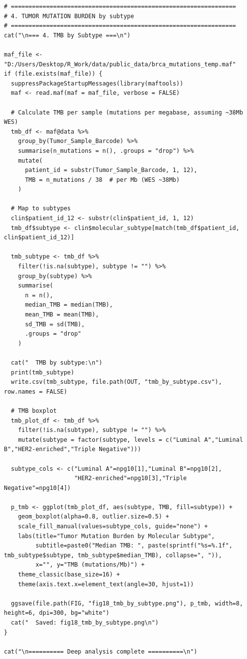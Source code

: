 \documentclass[12pt,a4paper]{ctexart}
\begin{document}
\begin{lstlisting}[caption={20_deep_analysis}, basicstyle=\ttfamily\scriptsize]
# ================================================================
# 4. TUMOR MUTATION BURDEN by subtype
# ================================================================
cat("\n=== 4. TMB by Subtype ===\n")

maf_file <- "D:/Users/Desktop/R_Work/data/public_data/brca_mutations_temp.maf"
if (file.exists(maf_file)) {
  suppressPackageStartupMessages(library(maftools))
  maf <- read.maf(maf = maf_file, verbose = FALSE)

  # Calculate TMB per sample (mutations per megabase, assuming ~38Mb WES)
  tmb_df <- maf@data %>%
    group_by(Tumor_Sample_Barcode) %>%
    summarise(n_mutations = n(), .groups = "drop") %>%
    mutate(
      patient_id = substr(Tumor_Sample_Barcode, 1, 12),
      TMB = n_mutations / 38  # per Mb (WES ~38Mb)
    )

  # Map to subtypes
  clin$patient_id_12 <- substr(clin$patient_id, 1, 12)
  tmb_df$subtype <- clin$molecular_subtype[match(tmb_df$patient_id, clin$patient_id_12)]

  tmb_subtype <- tmb_df %>%
    filter(!is.na(subtype), subtype != "") %>%
    group_by(subtype) %>%
    summarise(
      n = n(),
      median_TMB = median(TMB),
      mean_TMB = mean(TMB),
      sd_TMB = sd(TMB),
      .groups = "drop"
    )

  cat("  TMB by subtype:\n")
  print(tmb_subtype)
  write.csv(tmb_subtype, file.path(OUT, "tmb_by_subtype.csv"), row.names = FALSE)

  # TMB boxplot
  tmb_plot_df <- tmb_df %>%
    filter(!is.na(subtype), subtype != "") %>%
    mutate(subtype = factor(subtype, levels = c("Luminal A","Luminal B","HER2-enriched","Triple Negative")))

  subtype_cols <- c("Luminal A"=npg10[1],"Luminal B"=npg10[2],
                    "HER2-enriched"=npg10[3],"Triple Negative"=npg10[4])

  p_tmb <- ggplot(tmb_plot_df, aes(subtype, TMB, fill=subtype)) +
    geom_boxplot(alpha=0.8, outlier.size=0.5) +
    scale_fill_manual(values=subtype_cols, guide="none") +
    labs(title="Tumor Mutation Burden by Molecular Subtype",
         subtitle=paste0("Median TMB: ", paste(sprintf("%s=%.1f", tmb_subtype$subtype, tmb_subtype$median_TMB), collapse=", ")),
         x="", y="TMB (mutations/Mb)") +
    theme_classic(base_size=16) +
    theme(axis.text.x=element_text(angle=30, hjust=1))

  ggsave(file.path(FIG, "fig18_tmb_by_subtype.png"), p_tmb, width=8, height=6, dpi=300, bg="white")
  cat("  Saved: fig18_tmb_by_subtype.png\n")
}

cat("\n========== Deep analysis complete ==========\n")
\end{lstlisting}
\end{document}
